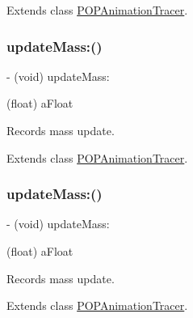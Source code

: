 Extends class \mbox{\hyperlink{interface_p_o_p_animation_tracer_aa5cc867da95a73d3254f38a86281233a}{P\+O\+P\+Animation\+Tracer}}.

\mbox{\label{category_p_o_p_animation_tracer_07_internal_08_a1e41c2f1b7c5332730d2c834e0420367}} 
\subsubsection{\texorpdfstring{update\+Mass\+:()}{updateMass:()}\hspace{0.1cm}{\footnotesize\ttfamily [1/2]}}
{\footnotesize\ttfamily -\/ (void) update\+Mass\+: \begin{DoxyParamCaption}\item[{(float)}]{a\+Float }\end{DoxyParamCaption}}

Records mass update. 

Extends class \mbox{\hyperlink{interface_p_o_p_animation_tracer_a1e41c2f1b7c5332730d2c834e0420367}{P\+O\+P\+Animation\+Tracer}}.

\mbox{\label{category_p_o_p_animation_tracer_07_internal_08_a1e41c2f1b7c5332730d2c834e0420367}} 
\subsubsection{\texorpdfstring{update\+Mass\+:()}{updateMass:()}\hspace{0.1cm}{\footnotesize\ttfamily [2/2]}}
{\footnotesize\ttfamily -\/ (void) update\+Mass\+: \begin{DoxyParamCaption}\item[{(float)}]{a\+Float }\end{DoxyParamCaption}}

Records mass update. 

Extends class \mbox{\hyperlink{interface_p_o_p_animation_tracer_a1e41c2f1b7c5332730d2c834e0420367}{P\+O\+P\+Animation\+Tracer}}.

